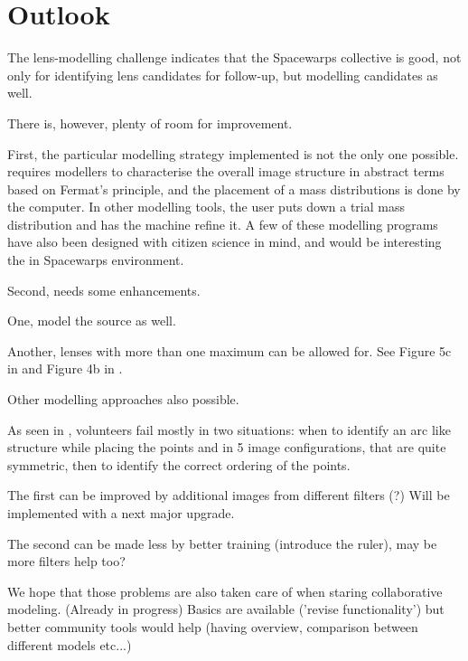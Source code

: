 \section{Outlook} \label{sec:todo}

The lens-modelling challenge indicates that the Spacewarps collective
is good, not only for identifying lens candidates for follow-up, but
modelling candidates as well.

There is, however, plenty of room for improvement.

First, the particular modelling strategy implemented is not the only
one possible.  \spl requires modellers to characterise the overall
image structure in abstract terms based on Fermat's principle, and the
placement of a mass distributions is done by the computer.  In other
modelling tools, the user puts down a trial mass distribution and has
the machine refine it.  A few of these modelling programs have also
been designed with citizen science in mind, and would be interesting
the in Spacewarps environment.

Second, \spl needs some enhancements.

One, model the source as well.


Another, lenses with more than one maximum can be allowed for.  See
Figure 5c in \citep{2001ApJ...557..594R} and Figure 4b in
\cite{2003ApJ...590...39K}.

Other modelling approaches also possible.

As seen in , volunteers fail mostly in two situations:
when to identify an arc like structure while placing the points
and in 5 image configurations, that are quite symmetric, then to identify the correct ordering of the points.

The first can be improved by additional images from different filters (?)
Will be implemented with a next major \spl upgrade.

The second can be made less by better training (introduce the ruler), may be more filters help too?

We hope that those problems are also taken care of when staring collaborative modeling. (Already in progress)
Basics are available ('revise functionality') but better community tools would help (having overview, comparison between different models etc...)




